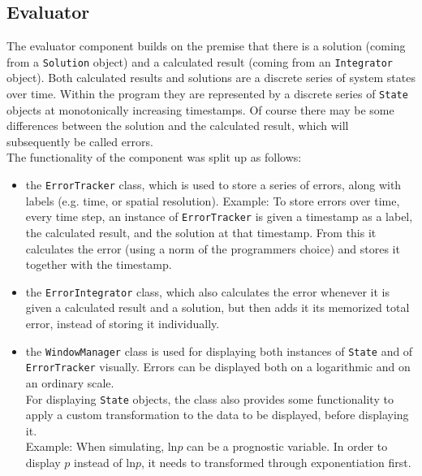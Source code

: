 \subsection*{Evaluator}
The evaluator component builds on the premise that there is a solution (coming from a \texttt{Solution} object) and a calculated result (coming from an \texttt{Integrator} object).
Both calculated results and solutions are a discrete series of system states over time.
Within the program they are represented by a discrete series of \texttt{State} objects at monotonically increasing timestamps.
Of course there may be some differences between the solution and the calculated result, which will subsequently be called errors.
\\
The functionality of the component was split up as follows:
\begin{itemize}
\item the \texttt{ErrorTracker} class, which is used to store a series of errors, along with labels (e.g. time, or spatial resolution).
Example: To store errors over time, every time step, an instance of \texttt{ErrorTracker} is given a timestamp as a label, the calculated result, and the solution at that timestamp.
From this it calculates the error (using a norm of the programmers choice) and stores it together with the timestamp.
\item the \texttt{ErrorIntegrator} class, which also calculates the error whenever it is given a calculated result and a solution, but then adds it its memorized total error, instead of storing it individually.
\item the \texttt{WindowManager} class is used for displaying both instances of \texttt{State} and of \texttt{ErrorTracker} visually.
Errors can be displayed both on a logarithmic and on an ordinary scale.
\\
For displaying \texttt{State} objects, the class also provides some functionality to apply a custom transformation to the data to be displayed, before displaying it.
\\
Example: When simulating, $\text{ln}p$ can be a prognostic variable. In order to display $p$ instead of $\text{ln}p$, it needs to transformed through exponentiation first.
\end{itemize}

